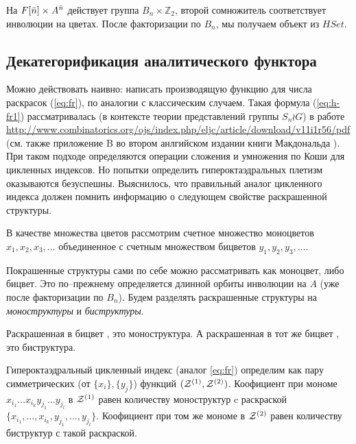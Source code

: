 На $F[\Bar n] \times A^{\Bar n}$ действует группа $B_n \times
\mathbb Z_2$, второй сомножитель соответствует инволюции на цветах. После
факторизации по $B_n$, мы получаем объект из $HSet$.



\subsection{Декатегорификация аналитического функтора} 
Можно действовать наивно: написать производящую функцию для числа раскрасок
(\ref{eq:fr}), по аналогии с классическим случаем. Такая формула
(\ref{eq:h-fr1}) рассматривалась (в контексте теории представлений группы $S_n \wr G$) в работе
\url{http://www.combinatorics.org/ojs/index.php/eljc/article/download/v11i1r56/pdf}
(см. также приложение B во втором анлгийском издании книги Макдональда
\cite{Mac2}). При таком подходе определяются операции сложения и умножения
по Коши для цикленных индексов. Но попытки определить
гипероктаэдральных плетизм оказываются безуспешны. Выяснилось, что правильный аналог цикленного
индекса должен помнить информацию о следующем свойстве раскрашенной структуры.

В качестве множества цветов рассмотрим счетное множество моноцветов $x_1,
x_2, x_3, \dots$ объединенное с счетным множеством бицветов $y_1, y_2, y_3, \dots$.

\begin{proposal}
Покрашенные структуры сами по себе можно рассматривать как моноцвет, либо
бицвет. Это по--прежнему определяется длинной орбиты инволюции на $A$ (уже
после факторизации по $B_n$). Будем разделять раскрашенные структуры на
\emph{моноструктуры} и \emph{биструктуры}. 
\end{proposal}

\begin{example}
Раскрашенная в бицвет \dA, это моноструктура. А раскрашенная в тот же бицвет
\dB, это биструктура.
\end{example}

\begin{proposal}
Гипероктаэдральный цикленный индекс (аналог \ref{eq:fr}) определим как пару
симметрических (от $\{x_i\}, \{y_j\}$) функций $(\mathcal Z^{(1)}, \mathcal Z^{(2)})$. Коофициент при
мономе $x_{i_1} \dots x_{i_k} y_{j_1} \dots y_{j_l}$ в $\mathcal Z^{(1)}$
равен количеству моноструктур c раскраской $\{x_{i_1}, \dots, x_{i_k}, y_{j_1},
\dots, y_{j_l}\}$. Коофициент при том же мономе в $\mathcal Z^{(2)}$ равен количеству
биструктур с такой раскраской. 
\end{proposal}

